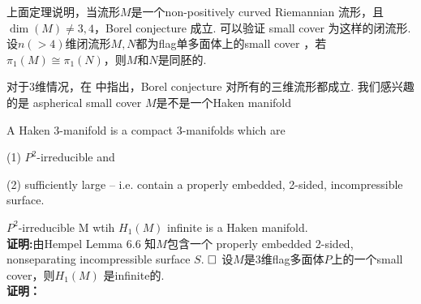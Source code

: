 \documentclass{article}
\theoremstyle{plain}%
\theoremstyle{definition}
\theoremstyle{remark}
\begin{document}
{上面定理说明，当流形$M$是一个non-positively curved Riemannian 流形，且$\dim (M)\neq 3,4$，Borel conjecture 成立. 可以验证 small cover 为这样的闭流形. 
{\cor 设$n(>4)$维闭流形$M,N$都为flag单多面体上的small cover ，若$\pi_1(M)\cong \pi_1(N)$，则$M$和$N$是同胚的.
}

对于$3$维情况，在\cite{AFW} 中指出，Borel conjecture 对所有的三维流形都成立. 我们感兴趣的是 aspherical small cover $M$是不是一个Haken manifold



{ 
A {Haken $3$-manifold} is a compact $3$-manifolds which are

\item[(1)]  $P^2$-irreducible and

\item[(2)] sufficiently large -- i.e. contain a properly embedded, 2-sided, incompressible surface.
}
{\prop  $P^2$-irreducible M wtih $H_1(M)$ infinite is a Haken manifold.}\\
{\bf 证明:}由Hempel \cite{He1} Lemma 6.6 知$M$包含一个 properly embedded 2-sided, nonseparating incompressible surface $S$. $\hfill{} \Box$
{\lem[*待证] 设$M$是$3$维flag多面体$P$上的一个small cover，则$H_1(M)$ 是infinite的.}\\
{\bf 证明：}




}
\end{document}
